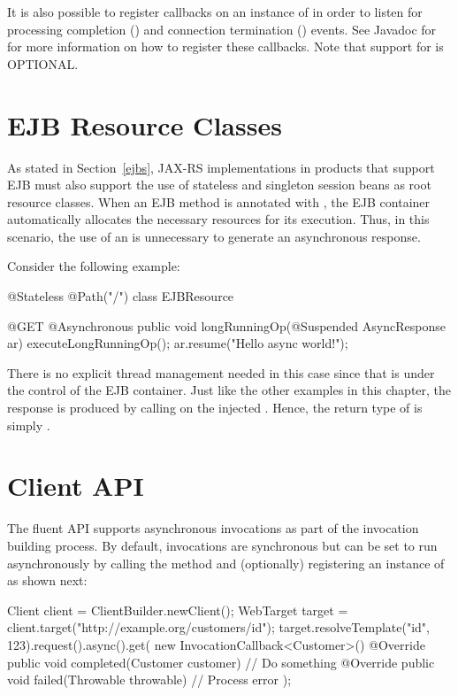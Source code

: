 It is also possible to register callbacks on an instance of  in order to listen for processing completion () and connection termination () events. See Javadoc for  for more information on how to register these callbacks. Note that support for  is OPTIONAL.


\section{EJB Resource Classes}
\label{async_ejbs}

As stated in Section~\ref{ejbs}, JAX-RS implementations in products that
support EJB must also support the use of stateless and singleton session beans
as root resource classes. When an EJB method is annotated with , the 
EJB container automatically allocates the necessary resources for its execution. 
Thus, in this scenario, the use of an  is unnecessary to generate
an asynchronous response.

Consider the following example:

\begin{listing}{1}
@Stateless 
@Path("/")
class EJBResource {

    @GET @Asynchronous
    public void longRunningOp(@Suspended AsyncResponse ar) {
        executeLongRunningOp();
        ar.resume("Hello async world!");
    }
}
\end{listing}

There is no explicit thread management needed in this case since that is
under the control of the EJB container. Just like the other examples in this chapter,
the response is produced by calling  on the injected . Hence, the return type of  is simply .

\section{Client API}
\label{client_api_async}

The fluent API supports asynchronous invocations as part of the invocation building process. By default, invocations are synchronous but can be set to run asynchronously by calling the  method and (optionally) registering an instance of  as shown next:

\begin{listing}{1}
Client client = ClientBuilder.newClient();
WebTarget target = client.target("http://example.org/customers/{id}");
target.resolveTemplate("id", 123).request().async().get(
    new InvocationCallback<Customer>() {
        @Override
        public void completed(Customer customer) {
            // Do something
        }
        @Override
        public void failed(Throwable throwable) {
            // Process error
        }
    });
\end{listing}

